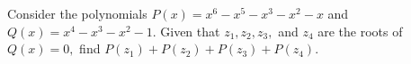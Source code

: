 Consider the polynomials $P(x)=x^{6}-x^{5}-x^{3}-x^{2}-x$ and $Q(x)=x^{4}-x^{3}-x^{2}-1.$ Given that $z_{1},z_{2},z_{3},$ and $z_{4}$ are the roots of $Q(x)=0,$ find $P(z_{1})+P(z_{2})+P(z_{3})+P(z_{4}).$